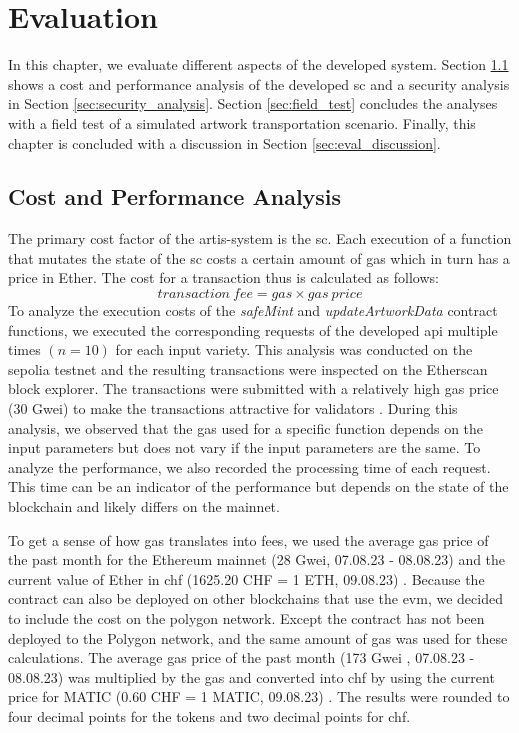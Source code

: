 \chapter{Evaluation}
\label{chap:evaluation}
In this chapter, we evaluate different aspects of the developed system. Section \ref{sec:cost_and_performance} shows a cost and performance analysis of the developed \gls{sc} and a security analysis in Section \ref{sec:security_analysis}. Section \ref{sec:field_test} concludes the analyses with a field test of a simulated artwork transportation scenario. Finally, this chapter is concluded with a discussion in Section \ref{sec:eval_discussion}.

\section{Cost and Performance Analysis}
\label{sec:cost_and_performance}
The primary cost factor of the artis-system is the \gls{sc}. Each execution of a function that mutates the state of the \gls{sc} costs a certain amount of gas which in turn has a price in Ether. The cost for a transaction thus is calculated as follows:
$$
transaction\ fee = gas \times gas\ price
$$
To analyze the execution costs of the \textit{safeMint} and \textit{updateArtworkData} contract functions, we executed the corresponding requests of the developed \gls{api} multiple times $(n = 10)$ for each input variety. This analysis was conducted on the sepolia testnet and the resulting transactions were inspected on the Etherscan block explorer. The transactions were submitted with a relatively high gas price (30 Gwei) to make the transactions attractive for validators \cite{ethergas}. During this analysis, we observed that the gas used for a specific function depends on the input parameters but does not vary if the input parameters are the same. To analyze the performance, we also recorded the processing time of each request. This time can be an indicator of the performance but depends on the state of the blockchain and likely differs on the mainnet.

To get a sense of how gas translates into fees, we used the average gas price of the past month for the Ethereum mainnet (28 Gwei, 07.08.23 - 08.08.23) \cite{gaspriceaverageethereum} and the current value of Ether in \gls{chf} (1625.20 CHF = 1 ETH, 09.08.23) \cite{coinmarketcap}. Because the contract can also be deployed on other blockchains that use the \gls{evm}, we decided to include the cost on the polygon network. Except the contract has not been deployed to the Polygon network, and the same amount of gas was used for these calculations. The average gas price of the past month (173 Gwei \cite{gaspriceaveragepolygon}, 07.08.23 - 08.08.23) was multiplied by the gas and converted into \gls{chf} by using the current price for MATIC (0.60 CHF = 1 MATIC, 09.08.23) \cite{coinmarketcap}. The results were rounded to four decimal points for the tokens and two decimal points for \gls{chf}.

